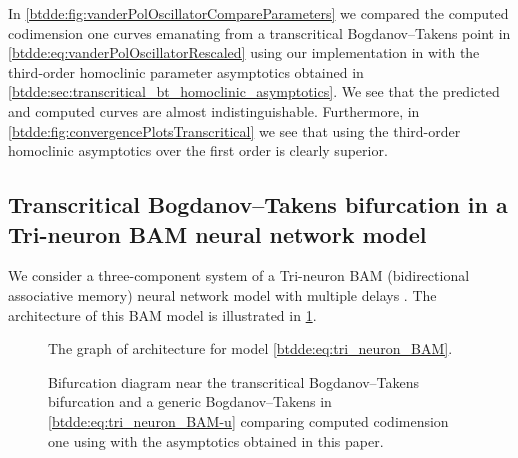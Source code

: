In \cref{btdde:fig:vanderPolOscillatorCompareParameters} we compared the computed
codimension one curves emanating from a transcritical Bogdanov--Takens point in
\cref{btdde:eq:vanderPolOscillatorRescaled} using our implementation in \DDEBIFTOOL
with the third-order homoclinic parameter asymptotics obtained in
\cref{btdde:sec:transcritical_bt_homoclinic_asymptotics}. We see that the predicted
and computed curves are almost indistinguishable. Furthermore, in
\cref{btdde:fig:convergencePlotsTranscritical} we see that using the third-order
homoclinic asymptotics over the first order is clearly superior.

\subsection{Transcritical Bogdanov--Takens bifurcation in a Tri-neuron BAM neural network model}
\label{btdde:sec:Tri-neuron-BAM-neural}

We consider a three-component system of a Tri-neuron BAM (bidirectional
associative memory) neural network model with multiple delays \cite{dong2013bogdanov}.
The architecture of this BAM model is illustrated in \cref{btdde:fig:BAM_architecture_graph}. 

\begin{figure}
\centering
{}
\caption{The graph of architecture for model \cref{btdde:eq:tri_neuron_BAM}.}
\label{btdde:fig:BAM_architecture_graph}
\end{figure}

\begin{figure}[ht]
\centering
{}
\caption{
Bifurcation diagram near the transcritical Bogdanov--Takens bifurcation and
a generic Bogdanov--Takens in \cref{btdde:eq:tri_neuron_BAM-u} comparing computed
codimension one using \DDEBIFTOOL with the asymptotics obtained in this
paper.}
\label{btdde:fig:triNeuronBAMNeuralNetworkModelCompareParameters}
\end{figure}

